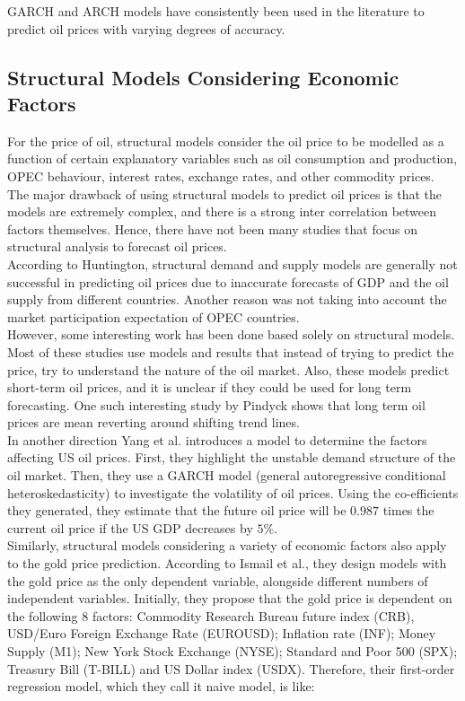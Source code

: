 \documentclass[runningheads]{llncs}
\begin{document}
\noindent GARCH and ARCH models have consistently been used in the literature to predict oil prices with varying degrees of accuracy. 

\subsection{Structural Models Considering Economic Factors}

For the price of oil, structural models consider the oil price to be modelled as a function of certain explanatory variables such as oil consumption and production, OPEC behaviour, interest rates, exchange rates, and other commodity prices. The major drawback of using structural models to predict oil prices is that the models are extremely complex, and there is a strong inter correlation between factors themselves. Hence, there have not been many studies that focus on structural analysis to forecast oil prices.\\

\noindent According to Huntington\cite{huntington}, structural demand and supply models are generally not successful in predicting oil prices due to inaccurate forecasts of GDP and the oil supply from different countries. Another reason was not taking into account the market participation expectation of OPEC countries. \\

\noindent However, some interesting work has been done based solely on structural models. Most of these studies use models and results that instead of trying to predict the price, try to understand the nature of the oil market. Also, these models predict short-term oil prices, and it is unclear if they could be used for long term forecasting. One such interesting study by Pindyck\cite{pindyck} shows that long term oil prices are mean reverting around shifting trend lines. \\

\noindent In another direction Yang et al. \cite{yang} introduces a model to determine the factors affecting US oil prices. First, they highlight the unstable demand structure of the oil market. Then, they use a GARCH model (general autoregressive conditional heteroskedasticity) to investigate the volatility of oil prices. Using the co-efficients they generated, they estimate that the future oil price will be $0.987$ times the current oil price if the US GDP decreases by $5\%$. \\

\noindent Similarly, structural models considering a variety of economic factors also apply to the gold price prediction. According to Ismail et al.\cite{gold-Ismail}, they design models with the gold price as the only dependent variable, alongside different numbers of independent variables. Initially, they propose that the gold price is dependent on the following 8 factors: Commodity Research Bureau future index (CRB), USD/Euro Foreign Exchange Rate (EUROUSD); Inflation rate (INF); Money Supply (M1); New York Stock Exchange (NYSE); Standard and Poor 500 (SPX); Treasury Bill (T-BILL) and US Dollar index (USDX). Therefore, their first-order regression model, which they call it naive model, is like: \\
\end{document}
